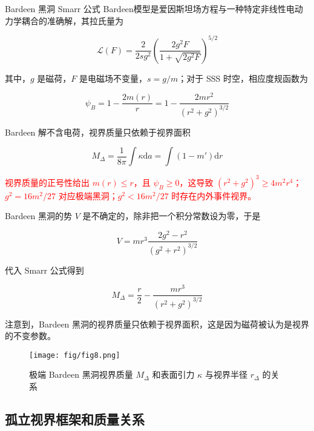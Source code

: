 \documentclass[9pt, dvipsnames]{beamer} %
\begin{document}
\begin{frame}{Bardeen 黑洞 Smarr 公式}
    Bardeen模型是爱因斯坦场方程与一种特定非线性电动力学耦合的准确解，其拉氏量为

    $$
    \mathcal{L}(F)
    =\frac{2 }{2 sg^2 } \left(\frac{2g^2 F }{1+\sqrt{2g^2 F} }  \right)^{5/2}
    $$

    其中，$g$ 是磁荷，$F$ 是电磁场不变量，$s=g/m$；对于 SSS 时空，相应度规函数为

    $$
    \psi_B
    =1-\frac{2 m(r) }{r } 
    =1-\frac{2mr^2 }{\left(r^2+g^2 \right)^{3/2} }
    $$

    Bardeen 解不含电荷，视界质量只依赖于视界面积

    $$
    M_\Delta
    =\frac{1 }{8\pi } \int\kappa \mathrm{d}a
    =\int \left(1-m' \right)\mathrm{d}r
    $$

    \textcolor{red}{视界质量的正号性给出 $m(r)\leqslant r$，且 $\psi_B\geqslant 0$，这导致 $(r^2+g^2)^3\geqslant 4m^2 r^4$；$g^2=16m^2/27$ 对应极端黑洞；$g^2<16m^2/27$ 时存在内外事件视界。}
\end{frame}

\begin{frame}
    Bardeen 黑洞的势 $V$ 是不确定的，除非把一个积分常数设为零，于是
    
    $$
    V = m r^3 \frac{2g^2 - r^2 }{\left(g^2 + r^2 \right)^{3/2} }
    $$

    代入 Smarr 公式得到

    $$
    M_\Delta = \frac{r }{2 } - \frac{m r^3 }{\left(r^2+g^2 \right)^{3/2} } 
    $$

    注意到，Bardeen 黑洞的视界质量只依赖于视界面积，这是因为磁荷被认为是视界的不变参数。
    \begin{figure}
        \centering
        \texttt{[image: fig/fig8.png]}
        \caption{极端 Bardeen 黑洞视界质量 $M_\Delta$ 和表面引力 $\kappa$ 与视界半径 $r_\Delta$ 的关系}
      \end{figure}
\end{frame}

\subsection{孤立视界框架和质量关系}
\end{document}
